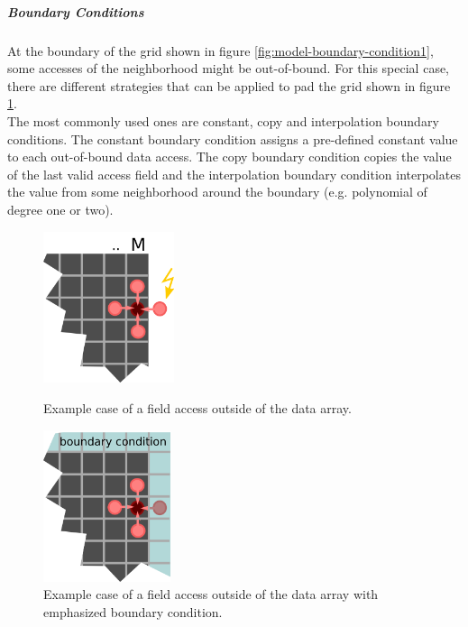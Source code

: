\subparagraph{Boundary Conditions}
At the boundary of the grid shown in figure \ref{fig:model-boundary-condition1}, some accesses of the neighborhood might be out-of-bound. For this special case, there are different strategies that can be applied to pad the grid shown in figure \ref{fig:model-boundary-condition2}. \\
The most commonly used ones are constant, copy and interpolation boundary conditions. The constant boundary condition assigns a pre-defined constant value to each out-of-bound data access. The copy boundary condition copies the value of the last valid access field and the interpolation boundary condition interpolates the value from some neighborhood around the boundary (e.g. polynomial of degree one or two).
\begin{figure}[H]
	\begin{minipage}{.5\columnwidth}
		\centering
		\includegraphics[height=12em]{drawings/model-boundary-condition1.png}
		\caption{Example case of a field access outside of the data array.}
		\label{fig:model-boundary-condition1}
		\vspace{1em}
	\end{minipage}
	\begin{minipage}{.5\columnwidth}
		\centering
		\includegraphics[height=12em]{drawings/model-boundary-condition2.png}
		\caption{Example case of a field access outside of the data array with emphasized boundary condition.}
		\label{fig:model-boundary-condition2}
	\end{minipage}
\end{figure}



